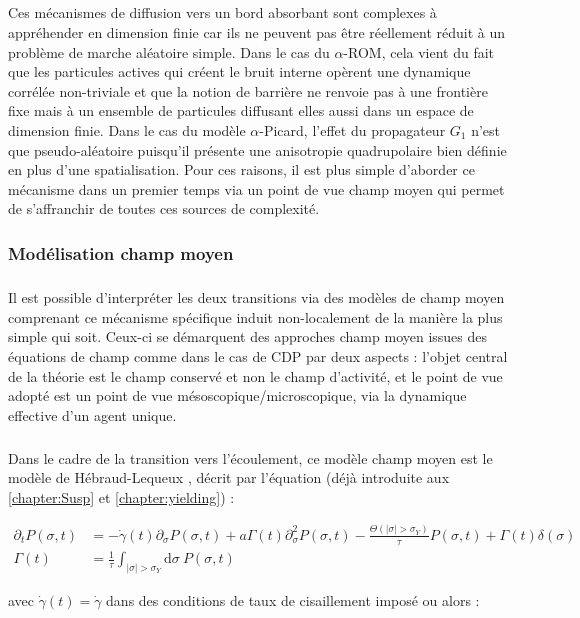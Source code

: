 \subparagraph{}Ces mécanismes de diffusion vers un bord absorbant sont complexes à appréhender en dimension finie car ils ne peuvent pas être réellement réduit à un problème de marche aléatoire simple. Dans le cas du $\alpha$-ROM, cela vient du fait que les particules actives qui créent le bruit interne opèrent une dynamique corrélée non-triviale et que la notion de barrière ne renvoie pas à une frontière fixe mais à un ensemble de particules diffusant elles aussi dans un espace de dimension finie. Dans le cas du modèle $\alpha$-Picard, l'effet du propagateur $G_1$ n'est que pseudo-aléatoire puisqu'il présente une anisotropie quadrupolaire bien définie en plus d'une spatialisation. Pour ces raisons, il est plus simple d'aborder ce mécanisme dans un premier temps via un point de vue champ moyen qui permet de s'affranchir de toutes ces sources de complexité. 

\subsubsection{Modélisation champ moyen}

\subparagraph{}Il est possible d’interpréter les deux transitions via des modèles de champ moyen comprenant ce mécanisme spécifique induit non-localement de la manière la plus simple qui soit. Ceux-ci se démarquent des approches champ moyen issues des équations de champ comme dans le cas de CDP par deux aspects : l'objet central de la théorie est le champ conservé et non le champ d'activité, et le point de vue adopté est un point de vue mésoscopique/microscopique, via la dynamique effective d'un agent unique.

\subparagraph{}Dans le cadre de la transition vers l'écoulement, ce modèle champ moyen est le modèle de Hébraud-Lequeux \cite{hebraud_mode-coupling_1998}, décrit par l'équation (déjà introduite aux \autoref{chapter:Susp} et \autoref{chapter:yielding}) :

\begin{equation}
\begin{aligned}
	\partial_t P(\sigma, t) &= -\dot{\gamma}(t)\partial_\sigma P(\sigma, t) + a\Gamma(t)\partial_\sigma^2P(\sigma, t) - \frac{\Theta (|\sigma|>\sigma_Y)}{\tau}P(\sigma, t) + \Gamma(t)\delta(\sigma)\\
	\Gamma(t) &= \frac{1}{\tau}\int_{|\sigma|>\sigma_Y}\mathrm{d}\sigma ~ P(\sigma, t)
\end{aligned}
\end{equation}

\noindent avec $\dot{\gamma}(t) = \dot{\gamma}$ dans des conditions de taux de cisaillement imposé ou alors :

